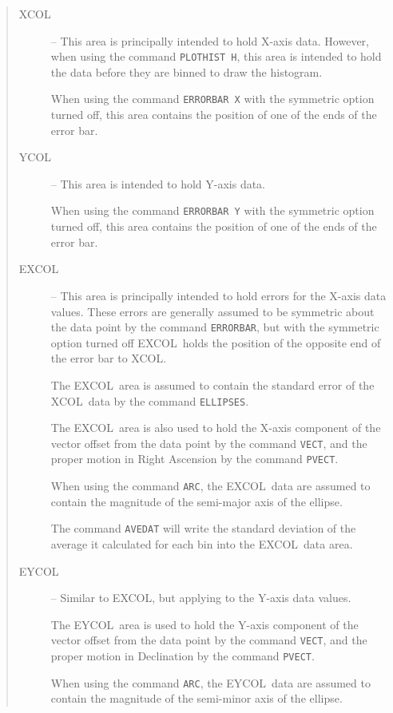 \documentclass[twoside,11pt]{article}
\newcommand{\htmlref}[2]{#1}
\renewcommand{\_}{\texttt{\symbol{95}}}
\newcommand{\xcol}{{\sf XCOL}}
\newcommand{\excol}{{\sf EXCOL}}
\newcommand{\ycol}{{\sf YCOL}}
\newcommand{\eycol}{{\sf EYCOL}}
\newcommand{\cnam}[1]{{\tt #1}}
\newcommand{\iref} [1]{\htmlref{#1}{#1}}
\begin{document}
\begin{quote}
\begin{description}
\item [\xcol] -- This area is principally intended to hold X-axis
data.  However, when using the command \cnam{\iref{PLOTHIST} H}, this
area is intended to hold the data before they are binned to draw the
histogram.

When using the command \cnam{\iref{ERRORBAR} X} with the symmetric
option turned off, this area contains the position of one of the ends
of the error bar.

\item [\ycol] -- This area is intended to hold Y-axis data.

When using the command \cnam{\iref{ERRORBAR} Y} with the symmetric
option turned off, this area contains the position of one of the ends
of the error bar.

\item [\excol] -- This area is principally intended to hold errors for the
X-axis data values.
These errors are generally assumed to be symmetric about the data point
by the command \cnam{\iref{ERRORBAR}}, but with the symmetric option turned off
\excol\ holds the position of the opposite end of the error bar to
\xcol.

The \excol\ area is assumed to contain the standard error of the \xcol\ data by
the command \cnam{\iref{ELLIPSES}}.

The \excol\ area is also used to hold the X-axis component of the
vector offset from the data point by the command \cnam{\iref{VECT}},
and the proper motion in Right Ascension by the command
\cnam{\iref{PVECT}}.

When using the command \cnam{\iref{ARC}}, the \excol\ data are assumed
to contain the magnitude of the semi-major axis of the ellipse.

The command \cnam{\iref{AVEDAT}} will write the standard deviation of
the average it calculated for each bin into the \excol\ data area.

\item [\eycol] -- Similar to \excol, but applying to the Y-axis data values.

The \eycol\ area is used to hold the Y-axis component of the vector
offset from the data point by the command \cnam{\iref{VECT}}, and the
proper motion in Declination by the command \cnam{\iref{PVECT}}.

When using the command \cnam{\iref{ARC}}, the \eycol\ data are assumed
to contain the magnitude of the semi-minor axis of the ellipse.


\end{description}
\end{quote}
\end{document}
